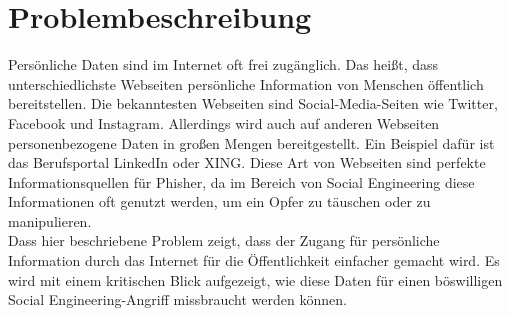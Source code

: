 

\chapter{Problembeschreibung}  %
\label{cha:Problemspezifikation} %
Persönliche Daten sind im Internet oft frei zugänglich. Das heißt, dass unterschiedlichste Webseiten persönliche Information von Menschen öffentlich bereitstellen. Die bekanntesten Webseiten sind Social-Media-Seiten wie Twitter, Facebook und Instagram. Allerdings wird auch auf anderen Webseiten personenbezogene Daten in großen Mengen bereitgestellt. Ein Beispiel dafür ist das Berufsportal LinkedIn oder XING. Diese Art von Webseiten sind perfekte Informationsquellen für Phisher, da im Bereich von Social Engineering diese Informationen oft genutzt werden, um ein Opfer zu täuschen oder zu manipulieren.\\
Dass hier beschriebene Problem zeigt, dass der Zugang für persönliche Information durch das Internet für die Öffentlichkeit einfacher gemacht wird. Es wird mit einem kritischen Blick aufgezeigt, wie diese Daten für einen böswilligen Social Engineering-Angriff missbraucht werden können.
